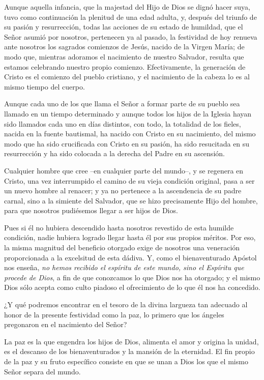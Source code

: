 				\begin{body}
					Aunque aquella infancia, que la majestad del Hijo de Dios se dignó hacer suya, tuvo como continuación la plenitud de una edad adulta, y, después del triunfo de su pasión y resurrección, todas las acciones de su estado de humildad, que el Señor asumió por nosotros, pertenecen ya al pasado, la festividad de hoy renueva ante nosotros los sagrados comienzos de Jesús, nacido de la Virgen María; de modo que, mientras adoramos el nacimiento de nuestro Salvador, resulta que estamos celebrando nuestro propio comienzo. Efectivamente, la generación de Cristo es el comienzo del pueblo cristiano, y el nacimiento de la cabeza lo es al mismo tiempo del cuerpo.
					
					Aunque cada uno de los que llama el Señor a formar parte de su pueblo sea llamado en un tiempo determinado y aunque todos los hijos de la Iglesia hayan sido llamados cada uno en días distintos, con todo, la totalidad de los fieles, nacida en la fuente bautismal, ha nacido con Cristo en su nacimiento, del mismo modo que ha sido crucificada con Cristo en su pasión, ha sido resucitada en su resurrección y ha sido colocada a la derecha del Padre en su ascensión.
					
					Cualquier hombre que cree --en cualquier parte del mundo--, y se regenera en Cristo, una vez interrumpido el camino de su vieja condición original, pasa a ser un nuevo hombre al renacer; y ya no pertenece a la ascendencia de su padre carnal, sino a la simiente del Salvador, que se hizo precisamente Hijo del hombre, para que nosotros pudiésemos llegar a ser hijos de Dios.
					
					Pues si él no hubiera descendido hasta nosotros revestido de esta humilde condición, nadie hubiera logrado llegar hasta él por sus propios méritos. Por eso, la misma magnitud del beneficio otorgado exige de nosotros una veneración proporcionada a la excelsitud de esta dádiva. Y, como el bienaventurado Apóstol nos enseña, \emph{no hemos recibido el espíritu de este mundo, sino el Espíritu que procede de Dios}, a fin de que conozcamos lo que Dios nos ha otorgado; y el mismo Dios sólo acepta como culto piadoso el ofrecimiento de lo que él nos ha concedido.
					
					¿Y qué podremos encontrar en el tesoro de la divina largueza tan adecuado al honor de la presente festividad como la paz, lo primero que los ángeles pregonaron en el nacimiento del Señor?
					
					La paz es la que engendra los hijos de Dios, alimenta el amor y origina la unidad, es el descanso de los bienaventurados y la mansión de la eternidad. El fin propio de la paz y su fruto específico consiste en que se unan a Dios los que el mismo Señor separa del mundo.
					

\end{body}
